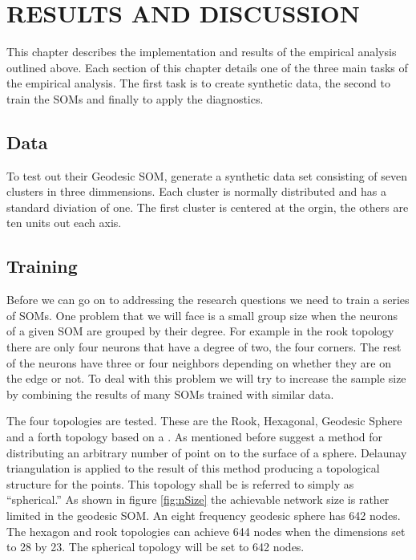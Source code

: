 \chapter{RESULTS AND DISCUSSION}
This chapter describes the implementation and results of the empirical analysis
outlined above.  Each section of this chapter details one of the three main
tasks of the empirical analysis.  The first task is to create synthetic data,
the second to train the SOMs and finally to apply the diagnostics.

\section{Data}
To test out their Geodesic SOM, \cite{wu2006} generate a synthetic data set
consisting of seven clusters in three dimmensions.  Each cluster is normally distributed and has a
standard diviation of one.  The first cluster is centered at the orgin, the
others are ten units out each axis. 

\section{Training}
Before we can go on to addressing the research questions we need to train a
series of SOMs. One problem that we will face is a small group size when the
neurons of a given SOM are grouped by their degree.  For example in the rook
topology there are only four neurons that have a degree of two, the four
corners. The rest of the neurons have three or four neighbors depending on
whether they are on the edge or not. To deal with this problem we will try to
increase the sample size by combining the results of many SOMs trained with
similar data.

The four topologies are tested. These are the Rook, Hexagonal, Geodesic Sphere
and a forth topology based on a \cite{Rakhmanov94}. As mentioned before
\cite{Rakhmanov94} suggest a method for distributing an arbitrary number of
point on to the surface of a sphere.  Delaunay triangulation is applied to the
result of this method producing a topological structure for the points.  This
topology shall be is referred to simply as ``spherical.''  As shown in figure
\ref{fig:nSize} the achievable network size is rather limited in the geodesic
SOM.  An eight frequency geodesic sphere has 642 nodes. The hexagon and rook
topologies can achieve 644 nodes when the dimensions set to 28 by 23. The
spherical topology will be set to 642 nodes.

